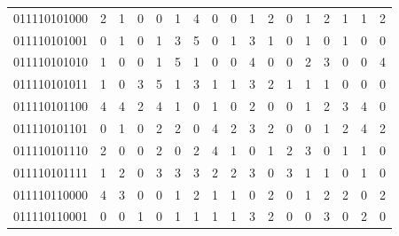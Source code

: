 \documentclass[10pt,a4paper]{article}
\begin{document}
\begin{longtable}{ |c|c|c|c|c|c|c|c|c|c|c|c|c|c|c|c|c| }
    011110101000              & 2                            & 1                                & 0                            & 0                              & 1   & 4   & 0   & 0   & 1   & 2   & 0   & 1   & 2   & 1   & 1   & 2   \\
    011110101001              & 0                            & 1                                & 0                            & 1                              & 3   & 5   & 0   & 1   & 3   & 1   & 0   & 1   & 0   & 1   & 0   & 0   \\
    011110101010              & 1                            & 0                                & 0                            & 1                              & 5   & 1   & 0   & 0   & 4   & 0   & 0   & 2   & 3   & 0   & 0   & 4   \\
    011110101011              & 1                            & 0                                & 3                            & 5                              & 1   & 3   & 1   & 1   & 3   & 2   & 1   & 1   & 1   & 0   & 0   & 0   \\
    011110101100              & 4                            & 4                                & 2                            & 4                              & 1   & 0   & 1   & 0   & 2   & 0   & 0   & 1   & 2   & 3   & 4   & 0   \\
    011110101101              & 0                            & 1                                & 0                            & 2                              & 2   & 0   & 4   & 2   & 3   & 2   & 0   & 0   & 1   & 2   & 4   & 2   \\
    011110101110              & 2                            & 0                                & 0                            & 2                              & 0   & 2   & 4   & 1   & 0   & 1   & 2   & 3   & 0   & 1   & 1   & 0   \\
    011110101111              & 1                            & 2                                & 0                            & 3                              & 3   & 3   & 2   & 2   & 3   & 0   & 3   & 1   & 1   & 0   & 1   & 0   \\
    011110110000              & 4                            & 3                                & 0                            & 0                              & 1   & 2   & 1   & 1   & 0   & 2   & 0   & 1   & 2   & 2   & 0   & 2   \\
    011110110001              & 0                            & 0                                & 1                            & 0                              & 1   & 1   & 1   & 1   & 3   & 2   & 0   & 0   & 3   & 0   & 2   & 0   \\

\end{longtable}
\end{document}
